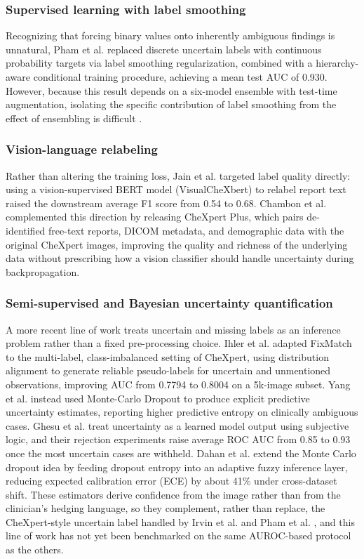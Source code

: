 \documentclass[conference]{IEEEtran}
\begin{document}
\subsubsection*{Supervised learning with label smoothing}
Recognizing that forcing binary values onto inherently ambiguous findings is unnatural, Pham et al. \cite{ref5} replaced discrete uncertain labels with continuous probability targets via label smoothing regularization, combined with a hierarchy-aware conditional training procedure, achieving a mean test AUC of 0.930. However, because this result depends on a six-model ensemble with test-time augmentation, isolating the specific contribution of label smoothing from the effect of ensembling is difficult \cite{ref5}.

\subsubsection*{Vision-language relabeling}
Rather than altering the training loss, Jain et al. \cite{ref6} targeted label quality directly: using a vision-supervised BERT model (VisualCheXbert) to relabel report text raised the downstream average F1 score from 0.54 to 0.68. Chambon et al. \cite{ref4} complemented this direction by releasing CheXpert Plus, which pairs de-identified free-text reports, DICOM metadata, and demographic data with the original CheXpert images, improving the quality and richness of the underlying data without prescribing how a vision classifier should handle uncertainty during backpropagation.

\subsubsection*{Semi-supervised and Bayesian uncertainty quantification}
A more recent line of work treats uncertain and missing labels as an inference problem rather than a fixed pre-processing choice. Ihler et al. \cite{ref7} adapted FixMatch to the multi-label, class-imbalanced setting of CheXpert, using distribution alignment to generate reliable pseudo-labels for uncertain and unmentioned observations, improving AUC from 0.7794 to 0.8004 on a 5k-image subset. Yang et al. \cite{ref8} instead used Monte-Carlo Dropout to produce explicit predictive uncertainty estimates, reporting higher predictive entropy on clinically ambiguous cases. Ghesu et al. \cite{ref12} treat uncertainty as a learned model output using subjective logic, and their rejection experiments raise average ROC AUC from 0.85 to 0.93 once the most uncertain cases are withheld. Dahan et al. \cite{ref11} extend the Monte Carlo dropout idea by feeding dropout entropy into an adaptive fuzzy inference layer, reducing expected calibration error (ECE) by about 41\% under cross-dataset shift. These estimators derive confidence from the image rather than from the clinician's hedging language, so they complement, rather than replace, the CheXpert-style uncertain label handled by Irvin et al. \cite{ref1} and Pham et al. \cite{ref5}, and this line of work has not yet been benchmarked on the same AUROC-based protocol as the others.
\end{document}
